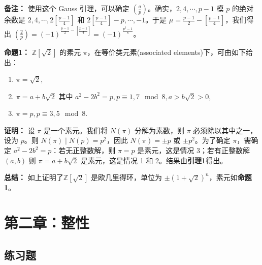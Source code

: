 \documentclass[UTF8]{ctexart}
\begin{document}
\begin{enumerate}
\textbf{备注：} 使用这个 Gauss 引理，可以确定 \(\left(\frac{a}{p}\right)\)。确实，\(2, 4, \cdots, p-1\) 模 \(p\) 的绝对余数是 \(2, 4, \cdots, 2 \left[\frac{p-1}{4}\right]\) 和 \(2 \left[\frac{p-1}{4}\right] - p, \cdots, -1\)。于是 \(\mu = \frac{p-1}{2} - \left[\frac{p-1}{4}\right]\)，我们得出 \(\left(\frac{2}{p}\right) = (-1)^{\frac{p-1}{2} - \left[\frac{p-1}{4}\right]} = (-1)^{\frac{p^2 - 1}{8}}\)。

\textbf{命题1：} \(\mathbb{Z}[\sqrt{2}]\) 的素元 \(\pi\)，在等价类元素(associated elements)下，可由如下给出：
\begin{enumerate}
    \item \(\pi = \sqrt{2}\),
    \item \(\pi = a + b \sqrt{2}\) 其中 \(a^2 - 2 b^2 = p, p \equiv 1, 7 \mod 8, a > b \sqrt{2} > 0\),
    \item \(\pi = p, p \equiv 3, 5 \mod 8\).
\end{enumerate}
\textbf{证明：} 设 \(\pi\) 是一个素元。我们将 \(N(\pi)\) 分解为素数，则 \(\pi\) 必须除以其中之一，设为 \(p\)。则 \(N(\pi) \mid N(p) = p^2\)，因此 \(N(\pi) = \pm p\) 或 \(\pm p^2\)。为了确定 \(\pi\)，需确定 \(a^2 - 2 b^2 = p\)：若无正整数解，则 \(\pi = p\) 是素元，这是情况 3；若有正整数解 \((a, b)\) 则 \(\pi = a + b \sqrt{2}\) 是素元，这是情况 1 和 2。结果由\textbf{引理1}得出。

\textbf{总结：} 如上证明了\(\mathbb{Z}[\sqrt{2}]\) 是欧几里得环，单位为 \(\pm (1 + \sqrt{2})^n\)，素元如\textbf{命题1}。

\end{enumerate}

\section{第二章：整性}

\subsection{练习题}
\end{document}
